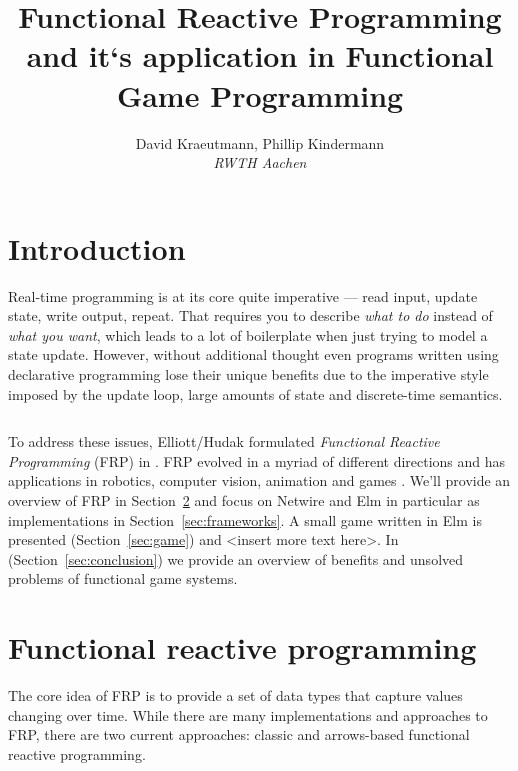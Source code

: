 \documentclass[pdftex,a4paper]{extarticle}
\title{Functional Reactive Programming and it`s application in Functional Game Programming}
\author{{\large David Kraeutmann, Phillip Kindermann} \\
{\em RWTH Aachen}}
\begin{document}
\maketitle

\section{Introduction}
Real-time programming is at its core quite imperative --- read input, update state, write output, repeat. 
That requires you to describe \emph{what to do} instead of \emph{what you want}, which leads to a lot of boilerplate when just trying to model a state update.
However, without additional thought even programs written using declarative programming lose their unique benefits due to the imperative style imposed by the update loop, large amounts of state and discrete-time semantics. 
\begin{listing}[ht]
\inputminted[breaklines=true]{haskell}{Loop.hs}
\label{lst:imperative}
\end{listing}

To address these issues, Elliott/Hudak formulated \emph{Functional Reactive Programming} (FRP) in \cite{ElliottHudak97:Fran}. FRP evolved in a myriad of different directions and has  applications in robotics, computer vision, animation and games \cite{haskell-wiki-yampa}. 
We'll provide an overview of FRP in Section~\ref{sec:frp}
and focus on Netwire and Elm in particular as implementations in Section~\ref{sec:frameworks}.
A small game written in Elm is presented (Section~\ref{sec:game}) and <insert more text here>. 
In (Section~\ref{sec:conclusion}) we provide an overview of benefits and unsolved problems of functional game systems.


\section{Functional reactive programming}
\label{sec:frp}
The core idea of FRP is to provide a set of data types that capture values changing over time. While there are many implementations and approaches to FRP, there are two current approaches: classic and arrows-based functional reactive programming. 
\end{document}
